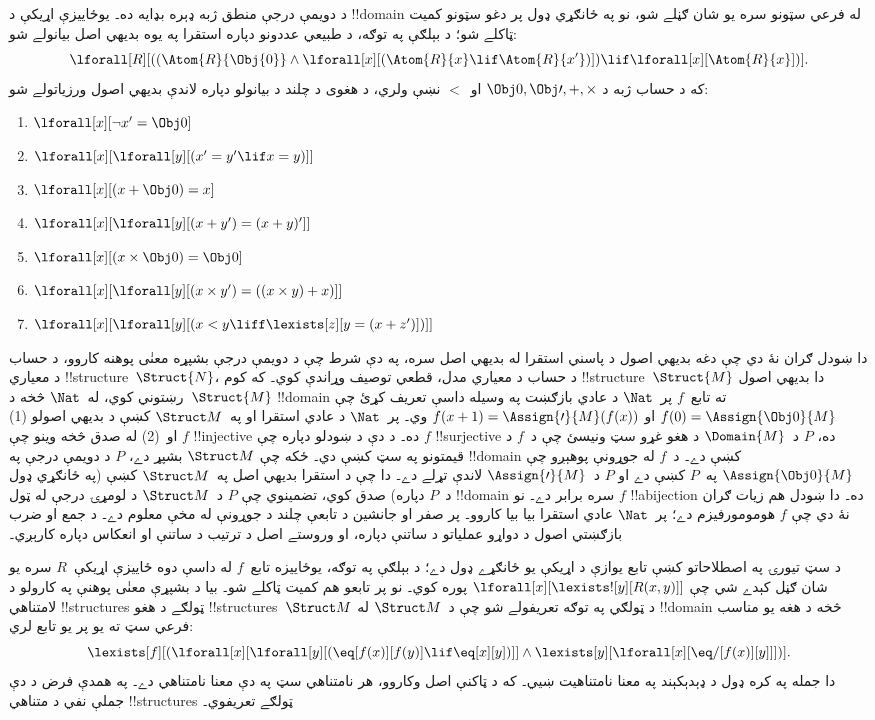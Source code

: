 \documentclass[../../../include/open-logic-section]{subfiles}
\begin{document}
د دويمې درجې منطق ژبه ډېره بډايه ده۔ يوځاييزې اړيکې د !!{domain} له
فرعي سټونو سره يو شان ګڼلے شو، نو په ځانګړي ډول پر دغو سټونو کميت
ټاکلے شو؛ د بېلګې په توګه، د طبيعي عددونو دپاره استقرا په يوه بديهي
اصل بيانولے شو:
\[
\lforall[R][((\Atom{R}{\Obj{0}} \land \lforall[x][(\Atom{R}{x} \lif
    \Atom{R}{x'})]) \lif \lforall[x][\Atom{R}{x}])].
\]
که د حساب ژبه د $\Obj 0, \Obj \prime, +, \times$ او~$<$ نښې ولري، د
هغوى د چلند د بيانولو دپاره لاندې بديهي اصول ورزياتولے شو:
\begin{enumerate}
\item $\lforall[x][\lnot x' = \Obj 0]$
\item $\lforall[x][\lforall[y][(x' = y' \lif x = y)]]$
\item $\lforall[x][(x + \Obj 0) = x]$
\item $\lforall[x][\lforall[y][(x + y') = (x + y)']]$
\item $\lforall[x][(x \times \Obj 0) = \Obj 0]$
\item $\lforall[x][\lforall[y][(x \times y') = ((x \times y) + x)]]$
\item $\lforall[x][\lforall[y][(x < y \liff \lexists[z][y = (x + z')])]]$
\end{enumerate}
دا ښودل ګران نۀ دي چې دغه بديهي اصول د پاسني استقرا له بديهي اصل سره،
په دې شرط چې د دويمې درجې بشپړه معنٰی پوهنه کاروو، د حساب د معياري
!!{structure}~$\Struct{N}$، د حساب د معياري مدل، قطعي توصيف وړاندې
کوي۔ که کوم !!{structure}~$\Struct{M}$
دا بديهي اصول رښتوني کوي، له~$\Nat$ څخه د~$\Struct{M}$ !!{domain} ته
تابع~$f$ پر~$\Nat$ د عادي بازګښت په وسيله داسې تعريف کړئ چې
$f(0) = \Assign{\Obj 0}{M}$ او $f(x+1) = \Assign{\prime}{M}(f(x))$ وي۔
پر~$\Nat$ د عادي استقرا او په~$\Struct M$ کښې د بديهي اصولو (1)
او~(2) له صدق څخه وينو چې $f$ !!{injective} ده۔ د دې د ښودلو دپاره
چې $f$ !!{surjective} ده، $P$ د~$\Domain{M}$ د هغو غړو سټ ونيسئ چې
د~$f$ د قيمتونو په سټ کښې دي۔ ځکه چې $\Struct M$ بشپړ دے، $P$ د
دويمې درجې په !!{domain} کښې دے۔ د~$f$ له جوړونې پوهېږو چې
$\Assign{\Obj 0}{M}$ په~$P$ کښې دے او $P$ د~$\Assign{\prime}{M}$
لاندې تړلے دے۔ دا چې د استقرا بديهي اصل په~$\Struct M$ کښې (په ځانګړي
ډول د~$P$ دپاره) صدق کوي، تضمينوي چې $P$ د~$\Struct M$ د لومړۍ درجې
له ټول !!{domain} سره برابر دے۔ نو $f$ !!a{bijection} ده۔ دا
ښودل هم زيات ګران نۀ دي چې $f$ هومومورفيزم دے؛ پر~$\Nat$ عادي استقرا
بيا بيا کاروو۔ پر صفر او جانشين د تابعې چلند د جوړونې له مخې
معلوم دے۔ د جمع او ضرب بازګښتي اصول د دواړو عملياتو د ساتنې
دپاره، او وروستے اصل د ترتيب د ساتنې او انعکاس دپاره کارېږي۔

د سټ تيورۍ په اصطلاحاتو کښې تابع يوازې د اړيکې يو ځانګړے ډول دے؛ د
بېلګې په توګه، يوځاييزه تابع~$f$ له داسې دوه ځاييزې اړيکې~$R$ سره يو
شان ګڼل کېدے شي چې $\lforall[x][\lexists![y][R(x,y)]]$ پوره کوي۔ نو
پر تابعو هم کميت ټاکلے شو۔ بيا د بشپړې معنٰی پوهنې په کارولو د
لامتناهي !!{structure}s ټولګے د هغو !!{structure}s~$\Struct M$ د
ټولګي په توګه تعريفولے شو چې د~$\Struct M$ له !!{domain} څخه د هغه
يو مناسب فرعي سټ ته يو پر يو تابع لري:
\[
\lexists[f][(\lforall[x][\lforall[y][(\eq[f(x)][f(y)] \lif \eq[x][y])]]
  \land \lexists[y][\lforall[x][\eq/[f(x)][y]]])].
\]
دا جمله په کره ډول د ډېدېکېند په معنا نامتناهيت ښيي۔ که د ټاکنې
اصل وکاروو، هر نامتناهي سټ په دې معنا نامتناهي دے۔ په همدې فرض
د دې جملې نفي د متناهي !!{structure}s ټولګے تعريفوي۔
\end{document}
